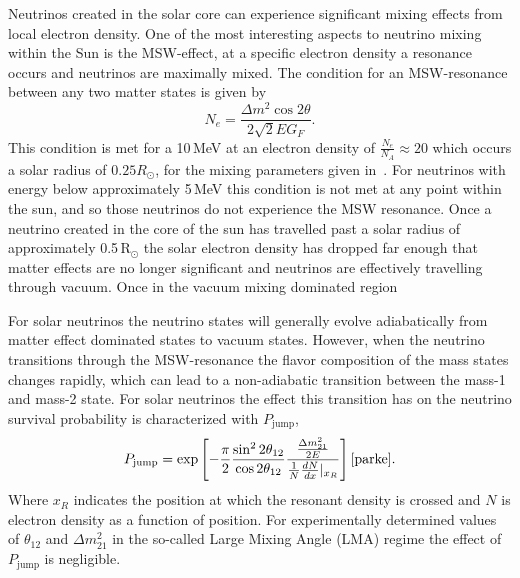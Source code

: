 Neutrinos created in the solar core can experience significant mixing effects from local
electron density.
One of the most interesting aspects to neutrino mixing within the Sun is the MSW-effect,
at a specific electron density a resonance occurs and neutrinos are maximally mixed.
The condition for an MSW-resonance between any two matter states is given by
\begin{equation}
    N_{e} = \frac{\Delta m^{2} \cos2\theta}{2\sqrt{2}EG_{F}}\text{.}
\end{equation}
This condition is met for a 10\,MeV at an electron density
of $\frac{N_{e}}{N_{A}} \approx 20$ which occurs a solar radius of $0.25R_{\odot}$, 
for the mixing parameters given in~\cite{pdg_globalfit}.
For neutrinos with energy below approximately 5\,MeV this condition is not met
at any point within the sun, and so those neutrinos do not experience the MSW
resonance.
Once a neutrino created in the core of the sun has travelled past a solar radius of
approximately 0.5\,$\text{R}_{\odot}$ %
the solar electron density has dropped far enough that matter effects are no longer significant
and neutrinos are effectively travelling through vacuum. Once in the vacuum mixing dominated region

For solar neutrinos the neutrino states will generally evolve adiabatically from
matter effect dominated states to vacuum states.
However, when the neutrino transitions through the MSW-resonance
the flavor composition of the mass states changes rapidly,
which can lead to a non-adiabatic transition
between the mass-1 and mass-2 state.
For solar neutrinos the effect this transition has on the
neutrino survival probability is characterized with $P_{\mathrm{jump}}$,
\begin{equation}
    P_{\mathrm{jump}} = \mathrm{exp}\left[-\dfrac{\pi}{2} \dfrac{\sin^{2}2\theta_{12}}{\cos2\theta_{12}}
               \dfrac{\frac{\Delta m^{2}_{21}}{2E}}{\frac{1}{N} \frac{dN}{dx}|_{x_{R}}}   \right]
\text{\cite{parke}.}
\end{equation}
Where $x_{R}$ indicates the position at which the resonant density is crossed
and $N$ is electron density as a function of position.
For experimentally determined values of $\theta_{12}$ and $\Delta m^{2}_{21}$ in the so-called
Large Mixing Angle (LMA) regime the effect of $P_{\mathrm{jump}}$ is negligible.

